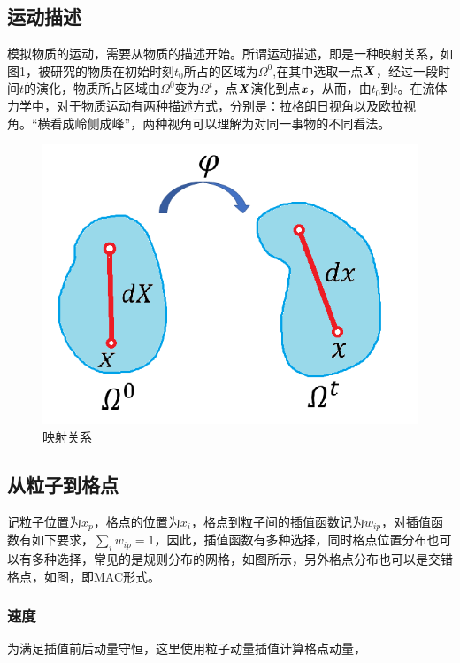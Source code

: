 \documentclass[UTF8]{article}
\begin{document}
\subsection{{运动描述}}
{\songti 模拟物质的运动，需要从物质的描述开始。所谓运动描述，即是一种映射关系，如图1，被研究的物质在初始时刻$t_0$所占的区域为$\Omega^0$,在其中选取一点$\textbf{\emph{X}}$，经过一段时间$t$的演化，物质所占区域由$\Omega^0$变为$\Omega^t$，点$\textbf{\emph{X}}$演化到点$\textbf{\emph{x}}$，从而，由$t_0$到$t$。在流体力学中，对于物质运动有两种描述方式，分别是：拉格朗日视角以及欧拉视角。“横看成岭侧成峰”，两种视角可以理解为对同一事物的不同看法。}


\begin{figure}[ht]

\centering
\includegraphics[scale=0.6]{chapter1/1.png}
\caption{映射关系}
\label{fig:label}
\end{figure}

\subsection{{从粒子到格点}}
{\songti 记粒子位置为$x_p$，格点的位置为$x_i$，格点到粒子间的插值函数记为$w_{ip}$，对插值函数有如下要求，$\sum_{i}w_{ip}=1$，因此，插值函数有多种选择，同时格点位置分布也可以有多种选择，常见的是规则分布的网格，如图所示，另外格点分布也可以是交错格点，如图，即MAC形式。
}
\subsubsection{{速度}}
{\songti 为满足插值前后动量守恒，这里使用粒子动量插值计算格点动量，
}
\end{document}

